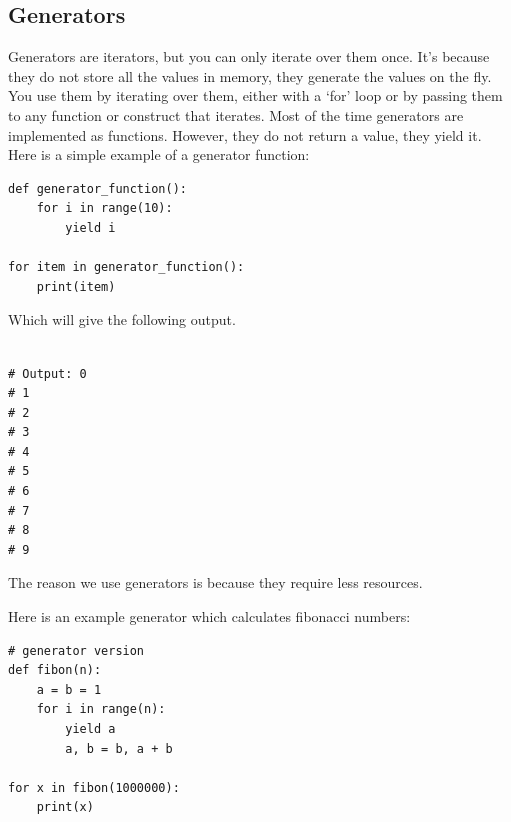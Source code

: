 \documentclass{report}
\begin{document}
    \subsection{Generators}
    \bigbreak \noindent
    Generators are iterators, but you can only iterate over them once. It’s because they do not store all the values in memory, they generate the values on the fly. You use them by iterating over them, either with a ‘for’ loop or by passing them to any function or construct that iterates. Most of the time generators are implemented as functions. However, they do not return a value, they yield it. Here is a simple example of a generator function:
    \begin{verbatim}
def generator_function():
    for i in range(10):
        yield i

for item in generator_function():
    print(item)
    \end{verbatim}
    Which will give the following output.
    \begin{verbatim}

# Output: 0
# 1
# 2
# 3
# 4
# 5
# 6
# 7
# 8
# 9
    \end{verbatim}
    The reason we use generators is because they require less resources.

    \bigbreak \noindent 
    Here is an example generator which calculates fibonacci numbers:
    \begin{verbatim}
# generator version
def fibon(n):
    a = b = 1
    for i in range(n):
        yield a
        a, b = b, a + b

for x in fibon(1000000):
    print(x)
    \end{verbatim}
\end{document}

